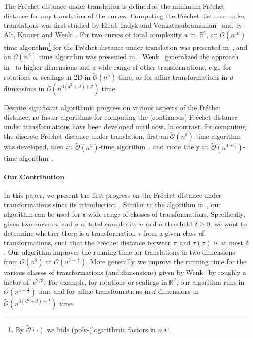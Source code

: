 \documentclass[thm-restate]{lipics-v2021}
\theoremstyle{remark}
\newcommand{\Oh}{\mathcal{O}}
\newcommand{\tOh}{\tilde{\mathcal{O}}}
\begin{document}
The Fréchet distance under translation is defined as the minimum Fréchet distance for any translation of the curves.
Computing the Fr\'echet distance under translations was first studied by Efrat, Indyk and Venkatasubramanian~\cite{EfratIV04} and  by Alt, Knauer and Wenk~\cite{altMatchingPolygonalCurves2001,knauerComparingGeometricPatterns2002, wenkShapeMatchingHigher2003}. 
For two curves of total complexity $n$ in~$\mathbb R^2$, an $\tOh(n^{10})$ time algorithm\footnote{By $\tOh(\cdot)$ we hide (poly-)logarithmic factors in $n$.} for the Fr\'echet distance under translation was presented in~\cite{EfratIV04}, and an $\tOh(n^8)$ time algorithm was presented in~\cite{altMatchingPolygonalCurves2001}.
Wenk~\cite{wenkShapeMatchingHigher2003} generalized the approach in~\cite{altMatchingPolygonalCurves2001} to higher dimensions and a wide range of other transformations, e.g., for rotations or scalings in 2D in $\tOh(n^5)$ time, or for affine transformations in $d$ dimensions in $\tOh(n^{3(d^2+d)+2})$ time.

Despite significant algorithmic progress on various aspects of the Fr\'echet distance, no faster algorithms for computing the (continuous) Fr\'echet distance under transformations have been developed until now. In contrast, for computing the discrete Fr\'echet distance under translation, first an $\tOh(n^6)$-time algorithm~\cite{JiangXZ07} was developed, then an $\tOh(n^5)$-time algorithm~\cite{AvrahamKS15}, and more lately an $\tOh(n^{4+\frac{2}{3}})$-time algorithm~\cite{bringmannFrechetDistanceTranslation2021}. 

\paragraph*{Our Contribution}
In this paper, we present the first
progress on the Fr\'echet distance under transformations since its introduction~\cite{altMatchingPolygonalCurves2001,EfratIV04,knauerComparingGeometricPatterns2002,wenkShapeMatchingHigher2003}. Similar to the algorithm in~\cite{altMatchingPolygonalCurves2001,wenkShapeMatchingHigher2003}, our algorithm can be used for a wide range of classes of transformations. Specifically, given two curves $\pi$ and $\sigma$ of total complexity $n$ and a threshold $\delta \geq 0$, we want to determine whether there is a transformation $\tau$ from a given class of transformations, such that the Fr\'echet distance between $\pi$ and $\tau(\sigma)$ is at most $\delta$. Our algorithm improves the running time for translations in two dimensions from $\Oh(n^8)$ to $\tOh(n^{7 + \frac 1 3})$. More generally, we improve the running time for the various classes of transformations (and dimensions) given by Wenk~\cite{altMatchingPolygonalCurves2001} by roughly a factor of~$n^{2/3}$. For example, for rotations or scalings in $\mathbb R^2$, our algorithm runs in $\tOh(n^{4 + \frac 1 3})$ time and for affine transformations in $d$ dimensions in $\tOh(n^{3(d^2+d)+\frac 1 3})$ time.
\end{document}
